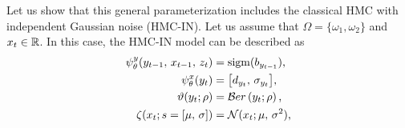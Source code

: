 
\begin{example}
  Let us show that this general parameterization
  includes the classical HMC with independent Gaussian noise (HMC-IN).
  Let us assume that $\Omega=\{\omega_1,\omega_2 \}$ and
  $x_t \in \mathbb{R}$. 
  In this case, the HMC-IN model can be described as
  \begin{align}
    \label{param-1}
    \psi^{y}_{\theta}(y_{t-1},\, x_{t-1},\, z_t) &= 
    {\rm sigm}( b_{y_{t-1}})
    \text{,} \\
    \label{param-2}
    \psi^{x}_{\theta}(y_{t}) 
    &= \big[d_{y_{t}},\, \sigma_{y_{t}} \big] \text{,} \\
    \label{param-32}
    \vartheta(y_t; \rho)&= {\mathcal Ber}\left(y_t; \rho \right) 
    \text{,} \\
    \label{param-4}
    \zeta(x_t; s = [\mu,\, {\sigma}] ) &=     
    \mathcal{N}(x_t; \mu,\, {\sigma}^2 )
    \text{,} 
\end{align}



\end{example}
